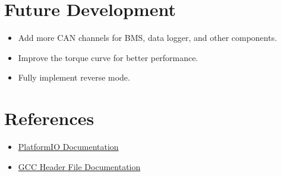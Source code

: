 \documentclass[a4paper,12pt]{article}
\begin{document}
\section{Future Development}
\begin{itemize}
    \item Add more CAN channels for BMS, data logger, and other components.
    \item Improve the torque curve for better performance.
    \item Fully implement reverse mode.
\end{itemize}

\section{References}
\begin{itemize}
    \item \href{https://docs.platformio.org/en/latest/}{PlatformIO Documentation}
    \item \href{https://gcc.gnu.org/onlinedocs/cpp/Header-Files.html}{GCC Header File Documentation}
\end{itemize}
\end{document}
